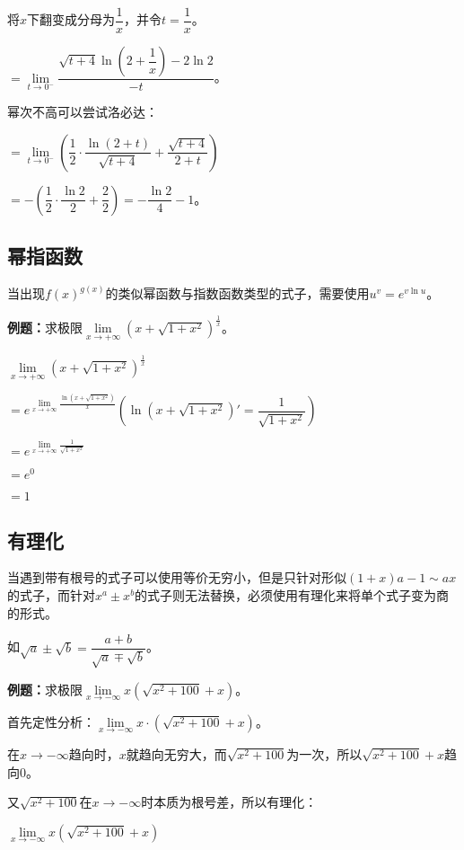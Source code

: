 \documentclass[UTF8, 12pt]{ctexart}
\begin{document}
将$x$下翻变成分母为$\dfrac{1}{x}$，并令$t=\dfrac{1}{x}$。\medskip

$=\lim\limits_{t\to 0^-}\dfrac{\sqrt{t+4}\ln\left(2+\dfrac{1}{x}\right)-2\ln 2}{-t}$。\medskip

幂次不高可以尝试洛必达：\medskip

$=\lim\limits_{t\to 0^-}\left(\dfrac{1}{2}\cdot\dfrac{\ln(2+t)}{\sqrt{t+4}}+\dfrac{\sqrt{t+4}}{2+t}\right)$\medskip

$=-\left(\dfrac{1}{2}\cdot\dfrac{\ln 2}{2}+\dfrac{2}{2}\right)=-\dfrac{\ln 2}{4}-1$。

\subsection{幂指函数}

当出现$f(x)^{g(x)}$的类似幂函数与指数函数类型的式子，需要使用$u^v=e^{v\ln u}$。

\textbf{例题：}求极限$\lim\limits_{x\to+\infty}(x+\sqrt{1+x^2})^{\frac{1}{x}}$。\medskip

$\lim\limits_{x\to+\infty}(x+\sqrt{1+x^2})^{\frac{1}{x}}$ \medskip

$=e^{\lim\limits_{x\to+\infty}\frac{\ln(x+\sqrt{1+x^2})}{x}} \left(\ln(x+\sqrt{1+x^2})'=\dfrac{1}{\sqrt{1+x^2}}\right)$\medskip

$=e^{\lim\limits_{x\to+\infty}\frac{1}{\sqrt{1+x^2}}}$

$=e^0$

$=1$

\subsection{有理化}

当遇到带有根号的式子可以使用等价无穷小，但是只针对形似$(1+x)a-1\sim ax$的式子，而针对$x^a\pm x^b$的式子则无法替换，必须使用有理化来将单个式子变为商的形式。

如$\sqrt{a}\pm\sqrt{b}=\dfrac{a+b}{\sqrt{a}\mp\sqrt{b}}$。\medskip

\textbf{例题：}求极限$\lim\limits_{x\to-\infty}x(\sqrt{x^2+100}+x)$。

首先定性分析：$\lim\limits_{x\to-\infty}x\cdot(\sqrt{x^2+100}+x)$。

在$x\to-\infty$趋向时，$x$就趋向无穷大，而$\sqrt{x^2+100}$为一次，所以$\sqrt{x^2+100}+x$趋向0。

又$\sqrt{x^2+100}$在$x\to-\infty$时本质为根号差，所以有理化：

$\lim\limits_{x\to-\infty}x(\sqrt{x^2+100}+x)$
\end{document}
